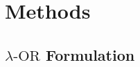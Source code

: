 \documentclass[pdflatex,sn-mathphys-num]{sn-jnl}%
\newcommand{\SPOR}{\textrm{$\lambda$-OR}}
\newcommand{\logor}{\log\SPOR}
\theoremstyle{thmstyleone}%
\theoremstyle{thmstyletwo}%
\theoremstyle{thmstylethree}%
\begin{document}





\section{Methods}

\subsection{$\SPOR$ Formulation}\label{sec:formulation}
\end{document}
